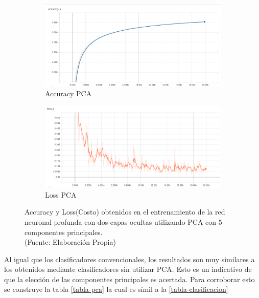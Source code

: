 \begin{figure}[ht!]
\centering
\begin{subfigure}{.5\textwidth}
  \centering
  \includegraphics[width=.8\linewidth]{figures/nn_plot_pca.png}
  \caption{Accuracy PCA}
  \label{fig:sub1}
\end{subfigure}%
\begin{subfigure}{.5\textwidth}
  \centering
  \includegraphics[width=.8\linewidth]{figures/nn_loss_pca.png}
  \caption{Loss PCA}
  \label{fig:sub2}
\end{subfigure}
\caption[Accuracy y Loss(Costo) obtenidos en el entrenamiento de la red neuronal profunda con dos capas ocultas utilizando PCA]{Accuracy y Loss(Costo) obtenidos en el entrenamiento de la red neuronal profunda con dos capas ocultas utilizando PCA con 5 componentes principales. \\
{\scriptsize (Fuente: Elaboración Propia)}}
\label{fig:nn_metrics_pca}
\end{figure}

Al igual que los clasificadores convencionales, los resultados son muy similares a los obtenidos mediante clasificadores sin utilizar PCA. Esto es un indicativo de que la elección de las componentes principales es acertada. Para corroborar esto se construye la tabla \autoref{tabla-pca} la cual es símil a la \autoref{tabla-clasificacion}

